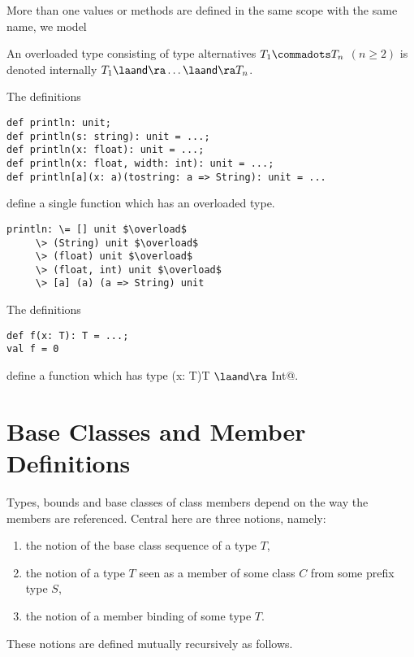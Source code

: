 \documentclass[11pt]{report}
\begin{document}
More than one values or methods are defined in the same scope with the
same name, we model

An overloaded type consisting of type alternatives $T_1 \commadots
T_n$ $(n \geq 2)$ is denoted internally $T_1 \overload \ldots
\overload T_n$.

\example The definitions
\begin{verbatim}
def println: unit;
def println(s: string): unit = ...;
def println(x: float): unit = ...;
def println(x: float, width: int): unit = ...;
def println[a](x: a)(tostring: a => String): unit = ...
\end{verbatim}
define a single function \verb@println@ which has an overloaded
type.
\begin{verbatim}
println: \= [] unit $\overload$
	 \> (String) unit $\overload$
	 \> (float) unit $\overload$
	 \> (float, int) unit $\overload$
	 \> [a] (a) (a => String) unit
\end{verbatim}

\example The definitions
\begin{verbatim}
def f(x: T): T = ...;
val f = 0
\end{verbatim}
define a function \verb@f@ which has type \verb@(x: T)T $\overload$ Int@.

\section{Base Classes and Member Definitions}
\label{sec:base-classes}

Types, bounds and base classes of class members depend on the way the
members are referenced.  Central here are three notions, namely:
\begin{enumerate}
\item the notion of the base class sequence of a type $T$,
\item the notion of a type $T$ seen as a member of some class $C$ from some 
      prefix type $S$,
\item the notion of a member binding of some type $T$.
\end{enumerate}
These notions are defined mutually recursively as follows.
\end{document}
